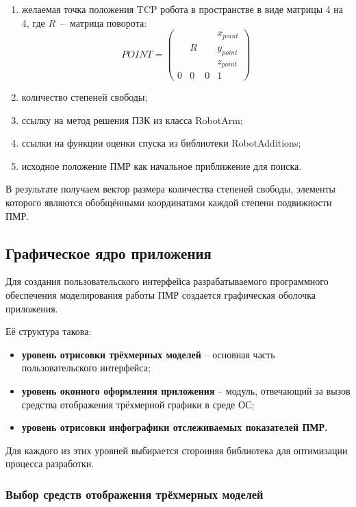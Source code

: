 \begin{enumerate} [label = \arabic*)]
    \item желаемая точка положения TCP робота в пространстве в виде матрицы 4 на 4, где $R$~--~матрица поворота:
    \begin{equation}
POINT = \left(
\begin{array}{cccc}\label{point_mat}
  &   &   & x_{point} \\
  & R &   & y_{point} \\
  &   &   & z_{point} \\
0 & 0 & 0 & 1
\end{array}
\right)
\end{equation}
    \item количество степеней свободы;
    \item ссылку на метод решения ПЗК из класса RobotArm;
    \item ссылки на функции оценки спуска из библиотеки RobotAdditions;
    \item исходное положение ПМР как начальное приближение для поиска.
\end{enumerate}

В результате получаем вектор размера количества степеней свободы, элементы которого являются обобщёнными координатами каждой степени подвижности ПМР.

\newpage
\subsection{\textbf{Графическое ядро приложения}}
Для создания пользовательского интерфейса разрабатываемого программного обеспечения моделирования работы ПМР создается графическая оболочка приложения.

Её структура такова:
\begin{itemize}
    \item \textbf{уровень отрисовки трёхмерных моделей} -- основная часть пользовательского интерфейса;
    \item \textbf{уровень оконного оформления приложения} -- модуль, отвечающий за вызов средства отображения трёхмерной графики в среде ОС;
    \item \textbf{уровень отрисовки инфографики отслеживаемых показателей ПМР.}
\end{itemize}

Для каждого из этих уровней выбирается сторонняя библиотека для оптимизации процесса разработки.

\subsubsection{\textbf{Выбор средств отображения трёхмерных моделей}}

